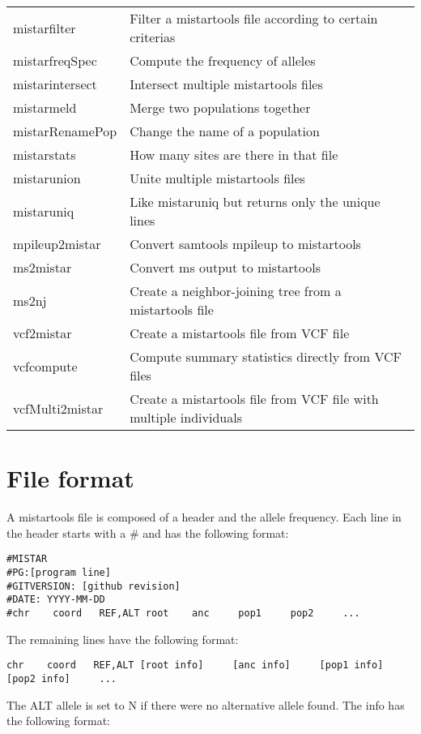 \documentclass[a4paper]{article}
\begin{document}
\begin{tabular}{|l|l|}
mistarfilter & Filter a mistartools file according to certain criterias \\
mistarfreqSpec & Compute the frequency of alleles \\
mistarintersect & Intersect multiple mistartools files \\
mistarmeld & Merge two populations together \\
mistarRenamePop & Change the name of a population \\
mistarstats & How many sites are there in that file \\
mistarunion & Unite multiple mistartools files \\
mistaruniq & Like mistaruniq but returns only the unique lines \\
mpileup2mistar & Convert samtools mpileup to mistartools \\
ms2mistar & Convert ms output to mistartools \\
ms2nj & Create a neighbor-joining tree from a mistartools file \\
vcf2mistar & Create a mistartools file from VCF file \\
vcfcompute & Compute summary statistics directly from VCF files \\
vcfMulti2mistar & Create a mistartools file from VCF file with multiple individuals \\
\hline
\end{tabular}

\section{File format}

\noindent  A mistartools file is composed of a header and the allele frequency. Each line in the header starts with a \# and has the following format:

\begin{verbatim}
#MISTAR
#PG:[program line]
#GITVERSION: [github revision]
#DATE: YYYY-MM-DD
#chr    coord   REF,ALT root    anc     pop1     pop2     ...
\end{verbatim}


\noindent The remaining lines have the following format:

\begin{verbatim}
chr    coord   REF,ALT [root info]     [anc info]     [pop1 info]     [pop2 info]     ...
\end{verbatim}

\noindent  The ALT allele is set to N if there were no alternative allele found. The info has the following format:
\end{document}

